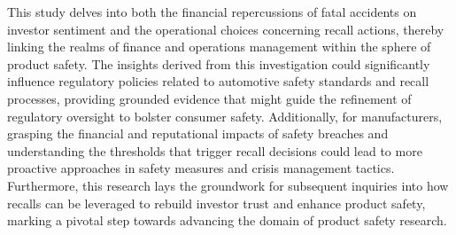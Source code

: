 \documentclass[12pt,a4paper]{article}
\begin{document}
    \hspace{1cm} This study delves into both the financial repercussions of fatal accidents on investor sentiment and the operational choices concerning recall actions, thereby linking the realms of finance and operations management within the sphere of product safety. The insights derived from this investigation could significantly influence regulatory policies related to automotive safety standards and recall processes, providing grounded evidence that might guide the refinement of regulatory oversight to bolster consumer safety. Additionally, for manufacturers, grasping the financial and reputational impacts of safety breaches and understanding the thresholds that trigger recall decisions could lead to more proactive approaches in safety measures and crisis management tactics. Furthermore, this research lays the groundwork for subsequent inquiries into how recalls can be leveraged to rebuild investor trust and enhance product safety, marking a pivotal step towards advancing the domain of product safety research.\
\end{document}
